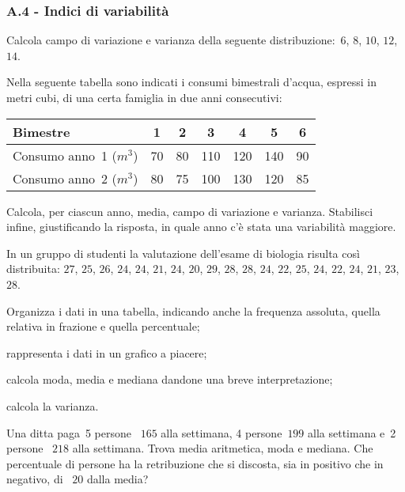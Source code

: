 \subsubsection*{A.4 - Indici di variabilità}

\begin{esercizio}
\label{ese:A.34}
Calcola campo di variazione e varianza della seguente distribuzione:~$6$, $8$, $10$, $12$, $14$.
\end{esercizio}

\begin{esercizio}
\label{ese:A.35}
Nella seguente tabella sono indicati i consumi bimestrali d'acqua, espressi in metri cubi, di una certa famiglia in due anni consecutivi:
\begin{center}
 \begin{tabular}{l*{6}{c}}
\toprule
Bimestre & 1 & 2 & 3 & 4 & 5 & 6 \\
\midrule
Consumo anno~1 ($\unit{m}^3$) & 70 & 80 & 110 & 120 & 140 & 90 \\
Consumo anno~2 ($\unit{m}^3$) & 80 & 75 & 100 & 130 & 120 & 85 \\
\bottomrule
\end{tabular}
\end{center}
Calcola, per ciascun anno, media, campo di variazione e varianza. Stabilisci infine, giustificando la risposta, in quale anno c'è stata una variabilità maggiore.
\end{esercizio}

\begin{esercizio}
\label{ese:A.36}
In un gruppo di studenti la valutazione dell'esame di biologia risulta così distribuita:
$27$, $25$, $26$, $24$, $24$, $21$, $24$, $20$, $29$, $28$,
$28$, $24$, $22$, $25$, $24$, $22$, $24$, $21$, $23$, $28$.
\begin{enumeratea}
 \item Organizza i dati in una tabella, indicando anche la frequenza assoluta, quella relativa in frazione e quella percentuale;
 \item rappresenta i dati in un grafico a piacere;
 \item calcola moda, media e mediana dandone una breve interpretazione;
 \item calcola la varianza.
\end{enumeratea}
\end{esercizio}

\begin{esercizio}
\label{ese:A.37}
Una ditta paga~5 persone \officialeuro~$165$ alla settimana, 4 persone\officialeuro~$199$ alla settimana e~2 persone \officialeuro~$218$ alla settimana.
Trova media aritmetica, moda e mediana. Che percentuale di persone ha la retribuzione che si discosta,
sia in positivo che in negativo, di \officialeuro~$20$ dalla media?
\end{esercizio}

